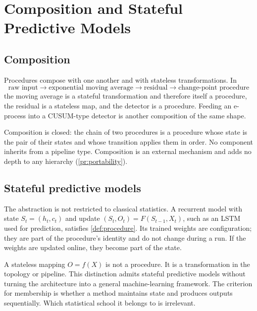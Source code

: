 \documentclass[11pt,a4paper]{article}
\theoremstyle{definition}
\theoremstyle{remark}
\begin{document}
\section{Composition and Stateful Predictive Models}
\label{sec:pipeline}

\subsection{Composition}

Procedures compose with one another and with stateless transformations.
In
\[
\text{raw input}
\rightarrow
\text{exponential moving average}
\rightarrow
\text{residual}
\rightarrow
\text{change-point procedure}
\]
the moving average is a stateful transformation and therefore itself a
procedure, the residual is a stateless map, and the detector is a
procedure. Feeding an e-process into a CUSUM-type detector is another
composition of the same shape.

Composition is closed: the chain of two procedures is a procedure whose
state is the pair of their states and whose transition applies them in
order. No component inherits from a pipeline type. Composition is an
external mechanism and adds no depth to any hierarchy
(\cref{pr:portability}).

\subsection{Stateful predictive models}
\label{sec:ml}

The abstraction is not restricted to classical statistics. A recurrent
model with state $S_t=(h_t,c_t)$ and update $(S_t,O_t)=F(S_{t-1},X_t)$,
such as an LSTM~\cite{hochreiter1997} used for prediction, satisfies
\cref{def:procedure}. Its trained weights are configuration; they are
part of the procedure's identity and do not change during a run. If the
weights are updated online, they become part of the state.

A stateless mapping $O=f(X)$ is not a procedure. It is a transformation
in the topology or pipeline. This distinction admits stateful predictive
models without turning the architecture into a general machine-learning
framework. The criterion for membership is whether a method maintains
state and produces outputs sequentially. Which statistical school it
belongs to is irrelevant.
\end{document}
